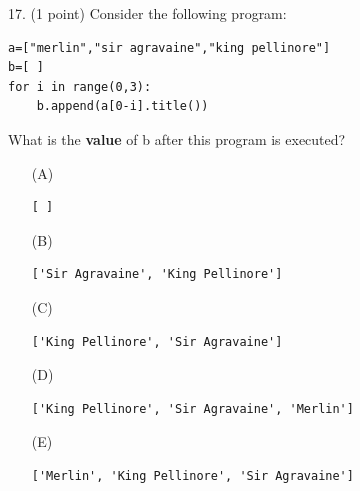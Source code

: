 \documentclass{article}
\begin{document}
\noindent
\begin{minipage}{\textwidth}
17. (1 point)
Consider the following program:
\begin{verbatim}
a=["merlin","sir agravaine","king pellinore"]
b=[ ]
for i in range(0,3):
    b.append(a[0-i].title())
\end{verbatim}
What is the \textbf{value} of b after this program is executed?

\begin{enumerate}
\item[(A)]
\begin{verbatim}[ ]\end{verbatim}

\item[(B)]
\begin{verbatim}['Sir Agravaine', 'King Pellinore']\end{verbatim}

\item[(C)]
\begin{verbatim}['King Pellinore', 'Sir Agravaine']\end{verbatim}

\item[(D)]
\begin{verbatim}['King Pellinore', 'Sir Agravaine', 'Merlin']\end{verbatim}

\item[(E)]
\begin{verbatim}['Merlin', 'King Pellinore', 'Sir Agravaine']\end{verbatim}

\end{enumerate}
\end{minipage}
\vspace{2em}
\filbreak\vfil{}\vfilneg
\end{document}
